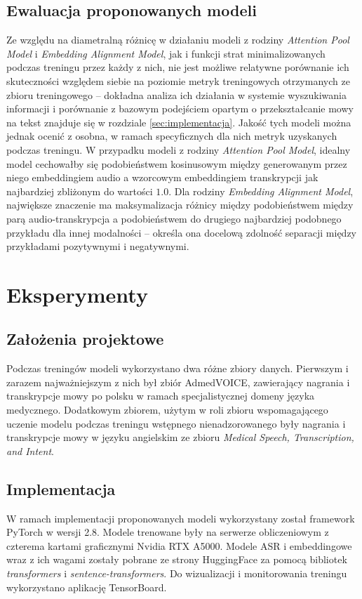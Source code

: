 \subsection{Ewaluacja proponowanych modeli}
Ze względu na diametralną różnicę w działaniu modeli z rodziny \textit{Attention Pool Model} i \textit{Embedding Alignment Model}, jak i funkcji strat minimalizowanych podczas treningu przez każdy z nich, nie jest możliwe relatywne porównanie ich skuteczności względem siebie na poziomie metryk treningowych otrzymanych ze zbioru treningowego -- dokładna analiza ich działania w systemie wyszukiwania informacji i porównanie z bazowym podejściem opartym o przekształcanie mowy na tekst znajduje się w rozdziale \ref{sec:implementacja}.
Jakość tych modeli można jednak ocenić z osobna, w ramach specyficznych dla nich metryk uzyskanych podczas treningu. W przypadku modeli z rodziny \textit{Attention Pool Model}, idealny model cechowałby się podobieństwem kosinusowym między generowanym przez niego embeddingiem audio a wzorcowym embeddingiem transkrypcji jak najbardziej zbliżonym do wartości $1.0$. Dla rodziny \textit{Embedding Alignment Model}, największe znaczenie ma maksymalizacja różnicy między podobieństwem między parą audio-transkrypcja a podobieństwem do drugiego najbardziej podobnego przykładu dla innej modalności -- określa ona docelową zdolność separacji między przykładami pozytywnymi i negatywnymi.
\section{Eksperymenty}
\subsection{Założenia projektowe}
Podczas treningów modeli wykorzystano dwa różne zbiory danych. Pierwszym i zarazem najważniejszym z nich był zbiór AdmedVOICE, zawierający nagrania i transkrypcje mowy po polsku w ramach specjalistycznej domeny języka medycznego. Dodatkowym zbiorem, użytym w roli zbioru wspomagającego uczenie modelu podczas treningu wstępnego nienadzorowanego były nagrania i transkrypcje mowy w języku angielskim ze zbioru \textit{Medical Speech, Transcription, and Intent}.
\subsection{Implementacja}
W ramach implementacji proponowanych modeli wykorzystany został framework PyTorch w wersji 2.8. Modele trenowane były na serwerze obliczeniowym z czterema kartami graficznymi Nvidia RTX A5000. Modele ASR i embeddingowe wraz z ich wagami zostały pobrane ze strony HuggingFace za pomocą bibliotek \textit{transformers} i \textit{sentence-transformers}. Do wizualizacji i monitorowania treningu wykorzystano aplikację TensorBoard.
